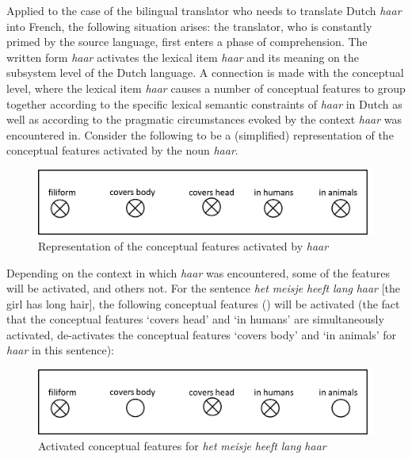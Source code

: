 Applied to the case of the bilingual translator who needs to translate Dutch \textit{haar} into French, the following situation arises: the translator, who is constantly primed by the source language, first enters a phase of comprehension. The written form \textit{haar} activates the lexical item \textit{haar} and its meaning on the subsystem level of the Dutch language. A connection is made with the conceptual level, where the lexical item \textit{haar} causes a number of conceptual features to group together according to the specific lexical semantic constraints of \textit{haar} in Dutch as well as according to the pragmatic circumstances evoked by the context \textit{haar} was encountered in. Consider the following  to be a (simplified) representation of the conceptual features activated by the noun \textit{haar}.

\begin{figure}
\includegraphics[height=.3\textheight]{figures/Vandevoorde2-img95.png}
\caption{\label{fig:key:92}  Representation of the conceptual features activated by \textit{haar}}
\end{figure}

Depending on the context in which \textit{haar} was encountered, some of the features will be activated, and others not. For the sentence \textit{het} \textit{meisje} \textit{heeft} \textit{lang} \textit{haar} [the girl has long hair], the following conceptual features () will be activated (the fact that the conceptual features ‘covers head’ and ‘in humans’ are simultaneously activated, de-activates the conceptual features ‘covers body’ and ‘in animals’ for \textit{haar} in this sentence):

\begin{figure}
\includegraphics[height=.3\textheight]{figures/Vandevoorde2-img96.png}
\caption{\label{fig:key:93}  Activated conceptual features for \textit{het} \textit{meisje} \textit{heeft} \textit{lang} \textit{haar}}
\end{figure}

